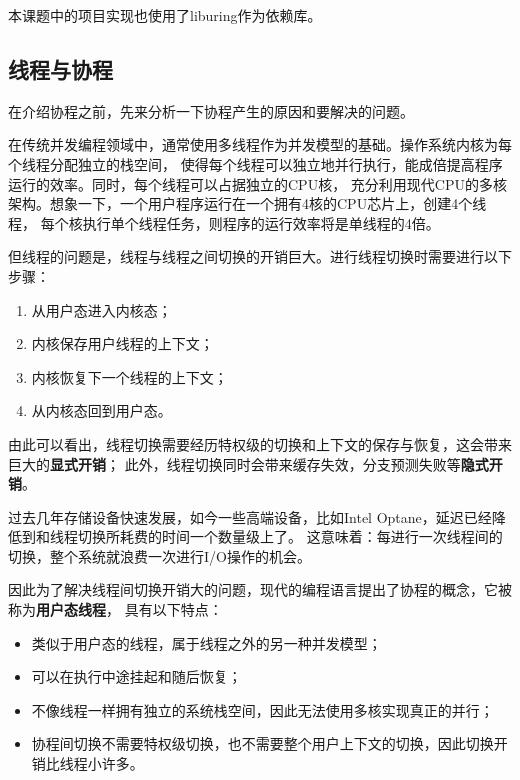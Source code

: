 \documentclass[supercite]{HustGraduPaper}
\theoremstyle{definition}
\begin{document}
本课题中的项目实现也使用了liburing作为依赖库。\par

\subsection{线程与协程}
在介绍协程之前，先来分析一下协程产生的原因和要解决的问题。\par

在传统并发编程领域中，通常使用多线程作为并发模型的基础。操作系统内核为每个线程分配独立的栈空间，
使得每个线程可以独立地并行执行，能成倍提高程序运行的效率。同时，每个线程可以占据独立的CPU核，
充分利用现代CPU的多核架构。想象一下，一个用户程序运行在一个拥有4核的CPU芯片上，创建4个线程，
每个核执行单个线程任务，则程序的运行效率将是单线程的4倍。\par

但线程的问题是，线程与线程之间切换的开销巨大。进行线程切换时需要进行以下步骤：

\begin{enumerate}
  \item 从用户态进入内核态；
  \item 内核保存用户线程的上下文；
  \item 内核恢复下一个线程的上下文；
  \item 从内核态回到用户态。
\end{enumerate}

由此可以看出，线程切换需要经历特权级的切换和上下文的保存与恢复，这会带来巨大的\textbf{显式开销}；
此外，线程切换同时会带来缓存失效，分支预测失败等\textbf{隐式开销}。\par

过去几年存储设备快速发展，如今一些高端设备，比如Intel Optane，延迟已经降低到和线程切换所耗费的时间一个数量级上了。
这意味着：每进行一次线程间的切换，整个系统就浪费一次进行I/O操作的机会。\par

因此为了解决线程间切换开销大的问题，现代的编程语言提出了协程的概念，它被称为\textbf{用户态线程}，
具有以下特点：

\begin{itemize}
  \item 类似于用户态的线程，属于线程之外的另一种并发模型；
  \item 可以在执行中途挂起和随后恢复；
  \item 不像线程一样拥有独立的系统栈空间，因此无法使用多核实现真正的并行；
  \item 协程间切换不需要特权级切换，也不需要整个用户上下文的切换，因此切换开销比线程小许多。
\end{itemize}
\end{document}
